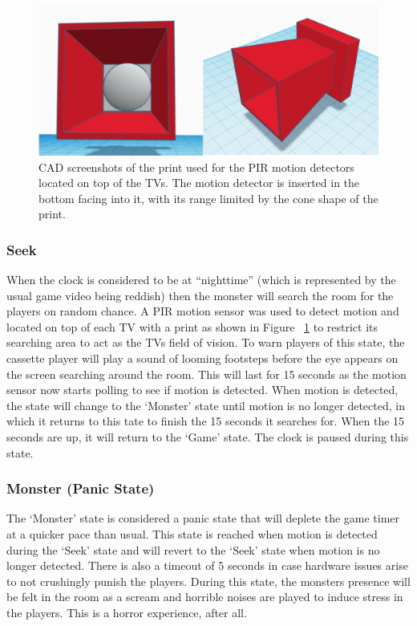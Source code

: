 \documentclass[conference]{IEEEtran}
\begin{document}
\begin{figure}[ht]
    \centering
    \includegraphics[width=0.90\columnwidth]{Images/PIR.png}
    \caption{CAD screenshots of the print used for the PIR motion detectors located on top of the TVs.
    The motion detector is inserted in the bottom facing into it, with its range limited by the cone shape of the print.}
    \label{fig:pir}
\end{figure}

\subsubsection{Seek}

\indent When the clock is considered to be at ``nighttime'' (which is represented by the usual game video being reddish) then the monster will search
the room for the players on random chance. A PIR motion sensor was used to detect motion and located on top of each TV with a print as shown in Figure ~\ref{fig:pir} to restrict its searching area to
act as the TVs field of vision. To warn players of this state, the cassette player will play a sound of looming footsteps before the eye appears on
the screen searching around the room. This will last for 15 seconds as the motion sensor now starts polling to see if motion is detected. When motion is
detected, the state will change to the `Monster' state until motion is no longer detected, in which it returns to this tate to finish the 15 seconds it
searches for. When the 15 seconds are up, it will return to the `Game' state. The clock is paused during this state.


\subsubsection{Monster (Panic State)}

\indent The `Monster' state is considered a panic state that will deplete the game timer at a quicker pace than usual. This state is reached when motion
is detected during the `Seek' state and will revert to the `Seek' state when motion is no longer detected. There is also a timeout of 5 seconds in case
hardware issues arise to not crushingly punish the players. During this state, the monsters presence will be felt in the room as a scream and 
horrible noises are played to induce stress in the players. This is a horror experience, after all. 
\end{document}
